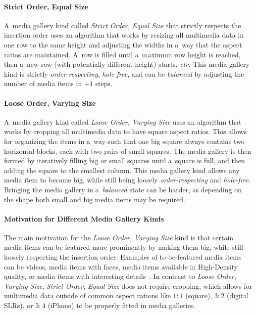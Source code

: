 \documentclass{sig-alternate}
\begin{document}
\paragraph{Strict Order, Equal Size}

A~media gallery kind called \emph{Strict Order, Equal Size}
that strictly respects the insertion order
uses an algorithm that works by resizing all multimedia data
in one row to the same height and adjusting the widths
in a~way that the aspect ratios are maintained.
A~row is filled until a~maximum row height is reached,
then a~new row (with potentially different height) starts, \emph{etc.}
This media gallery kind is strictly \emph{order-respecting},
\emph{hole-free}, and can be \emph{balanced}
by adjusting the number of media items in $+1$ steps.

\paragraph{Loose Order, Varying Size}

A~media gallery kind called \emph{Loose Order, Varying Size}
uses an algorithm that works by cropping all multimedia data
to have square aspect ratios.
This allows for organizing the items in a~way such that one big square
always contains two horizontal blocks,
each with two pairs of small squares.
The media gallery is then formed by iteratively filling
big or small squares until a~square is full,
and then adding the square to the smallest column.
This media gallery kind allows any media item to become big,
while still being loosely \emph{order-respecting} and \emph{hole-free}.
Bringing the media gallery in a~\emph{balanced} state can be harder,
as depending on the shape both small and big
media items may be required.

\paragraph{Motivation for Different Media Gallery Kinds}

The main motivation for the \emph{Loose Order, Varying Size} kind
is that certain media items can be featured more prominently
by making them big, while still loosely respecting the insertion order.
Examples of to-be-featured media items can be videos,
media items with faces, media items available in High-Density quality,
or media items with interesting details~\cite{suh2003thumbnail}.
In contrast to \emph{Loose Order, Varying Size},
\emph{Strict Order, Equal Size} does not require cropping,
which allows for multimedia data outside of common aspect rations like
$1:1$ (square), $3:2$ (digital SLRs), or $3:4$ (iPhone)
to be properly fitted in media galleries.
\end{document}
